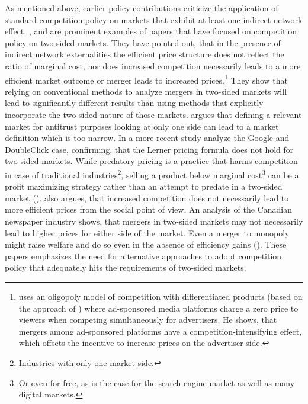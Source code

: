 \documentclass[12pt,a4paper]{scrreprt}
\begin{document}
As mentioned above, earlier policy contributions criticize the application of standard competition policy on markets that exhibit at least one indirect network effect. \cite{evans_antitrust_2003}, \cite{evans_industrial_2007} \cite{wright_one-sided_2004} and \cite{kaiser_price_2006} are prominent examples of papers that have focused on competition policy on two-sided markets. They have pointed out, that in the presence of indirect network externalities the efficient price structure does not reflect the ratio of marginal cost, nor does increased competition necessarily leads to a more efficient market outcome or merger leads to increased prices.\footnote{\cite{malam_mergers_2011} uses an oligopoly model of competition with differentiated products (based on the approach of \cite{salop_monopolistic_1979}) where ad-sponsored media platforms charge a zero price to viewers when competing simultaneously for advertisers. He shows, that mergers among ad-sponsored platforms have a competition-intensifying effect, which offsets the incentive to increase prices on the advertiser side.} They show that relying on conventional methods to analyze mergers in two-sided markets will lead to significantly different results than using methods that explicitly incorporate the two-sided nature of those markets. \cite{evans_antitrust_2003} argues that defining a relevant market for antitrust purposes looking at only one side can lead to a market definition which is too narrow. In a more recent study \cite{evans_analysis_2008} analyze the Google and DoubleClick case, confirming, that the Lerner pricing formula does not hold for two-sided markets. While predatory pricing is a practice that harms competition in case of traditional industries\footnote{Industries with only one market side.}, selling a product below marginal cost\footnote{Or even for free, as is the case for the search-engine market as well as many digital markets.} can be a profit maximizing strategy rather than an attempt to predate in a two-sided market (\cite{wright_one-sided_2004}). \cite{wright_one-sided_2004} also argues, that increased competition does not necessarily lead to more efficient prices from the social point of view. An analysis of the Canadian newspaper industry shows, that mergers in two-sided markets may not necessarily lead to higher prices for either side of the market. Even a merger to monopoly might raise welfare and do so even in the absence of efficiency gains (\cite{leonello_horizontal_2010}). These papers emphasizes the need for alternative approaches to adopt competition policy that adequately hits the requirements of two-sided markets. 
\end{document}
